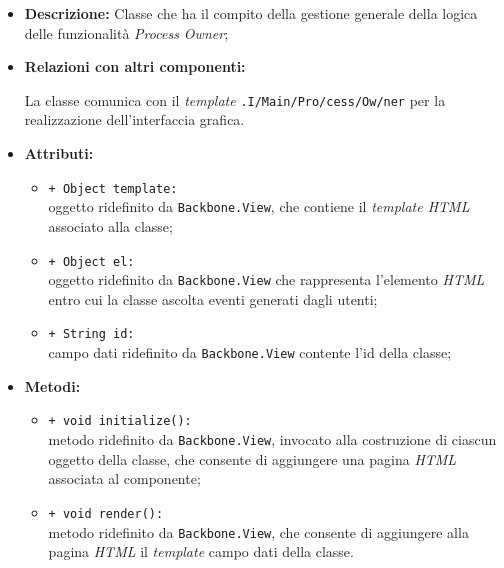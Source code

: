 \begin{flushleft}
\begin{itemize}
\item \textbf{Descrizione:} Classe che ha il compito della gestione generale della logica delle funzionalità \textit{Process Owner};
\item \textbf{Relazioni con altri componenti:}
\begin{sloppypar}
La classe comunica con il \textit{template} \texttt{\viewAdmin{}.I\fshyp{}Main\fshyp{}Pro\fshyp{}cess\fshyp{}Ow\fshyp{}ner} per la realizzazione dell'interfaccia grafica.
\end{sloppypar}
\item \textbf{Attributi:}
\begin{sloppypar}
\begin{itemize}
\item \texttt{+ Object template:}\\ oggetto ridefinito da \texttt{Backbone.View}, che contiene il \textit{template HTML} associato alla classe;
\item \texttt{+ Object el:}\\ oggetto ridefinito da \texttt{Backbone.View} che rappresenta l'elemento \textit{HTML} entro cui la classe ascolta eventi generati dagli utenti;
\item \texttt{+ String id:}\\ campo dati ridefinito da \texttt{Backbone.View} contente l'id della classe;
\end{itemize}
\end{sloppypar}
\item \textbf{Metodi:}
\begin{sloppypar}
\begin{itemize}
\item \texttt{+ void initialize():}\\ metodo ridefinito da \texttt{Backbone.View}, invocato alla costruzione di ciascun oggetto della classe, che consente di aggiungere una pagina \textit{HTML} associata al componente;
\item \texttt{+ void render():}\\ metodo ridefinito da \texttt{Backbone.View}, che consente di aggiungere alla pagina \textit{HTML} il \textit{template} campo dati della classe.
\end{itemize}
\end{sloppypar}
\end{itemize}
\end{flushleft}

